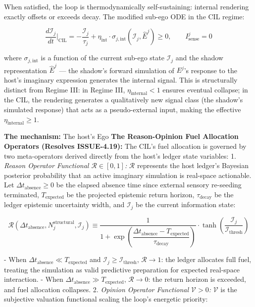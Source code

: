 \documentclass[11pt,a4paper]{article}
\theoremstyle{definition}
\theoremstyle{remark}
\begin{document}
When satisfied, the loop is thermodynamically self-sustaining: internal rendering exactly offsets or exceeds decay. The modified sub-ego ODE in the CIL regime:


\begin{equation}
\frac{d\mathcal{I}_j}{dt}\Bigg|_{\text{CIL}} = -\frac{\mathcal{I}_j}{\tau_j} + \eta_{\text{int}} \cdot \sigma_{j,\text{int}}(\mathcal{I}_j, \hat{E}^j) \geq 0, \qquad I_{\text{sense}}^j = 0
\end{equation}


where $\sigma_{j,\text{int}}$ is a function of the current sub-ego state $\mathcal{I}_j$ and the shadow representation $\hat{E}^j$ — the shadow's forward simulation of $E^j$'s response to the host's imaginary expression generates the internal signal. This is structurally distinct from Regime III: in Regime III, $\eta_{\text{internal}} < 1$ ensures eventual collapse; in the CIL, the rendering generates a qualitatively new signal class (the shadow's simulated response) that acts as a pseudo-external input, making the effective $\eta_{\text{internal}} \geq 1$.

\textbf{The mechanism:} The host's Ego \textbf{The Reason-Opinion Fuel Allocation Operators (Resolves ISSUE-4.19):} The CIL's fuel allocation is governed by two meta-operators derived directly from the host's ledger state variables:
1. \textit{Reason Operator Functional $\mathcal{R} \in [0,1]$:} $\mathcal{R}$ represents the host ledger's Bayesian posterior probability that an active imaginary simulation is real-space actionable. Let $\Delta t_{\text{absence}} \ge 0$ be the elapsed absence time since external sensory re-seeding terminated, $T_{\text{expected}}$ be the projected epistemic return horizon, $\tau_{\text{decay}}$ be the ledger epistemic uncertainty width, and $\mathcal{I}_j$ be the current information state:


\begin{equation}
\boxed{\mathcal{R}\left(\Delta t_{\text{absence}}, N_j^{\text{structural}}, \mathcal{I}_j\right) \equiv \frac{1}{1 + \exp\left(\dfrac{\Delta t_{\text{absence}} - T_{\text{expected}}}{\tau_{\text{decay}}}\right)} \cdot \tanh\left(\frac{\mathcal{I}_j}{\mathcal{I}_{\text{thresh}}}\right)}
\end{equation}


- When $\Delta t_{\text{absence}} \ll T_{\text{expected}}$ and $\mathcal{I}_j \ge \mathcal{I}_{\text{thresh}}$, $\mathcal{R} \to 1$: the ledger allocates full fuel, treating the simulation as valid predictive preparation for expected real-space interaction.
- When $\Delta t_{\text{absence}} \gg T_{\text{expected}}$, $\mathcal{R} \to 0$: the return horizon is exceeded, and fuel allocation collapses.
2. \textit{Opinion Operator Functional $\mathcal{V} > 0$:} $\mathcal{V}$ is the subjective valuation functional scaling the loop's energetic priority:
\end{document}

